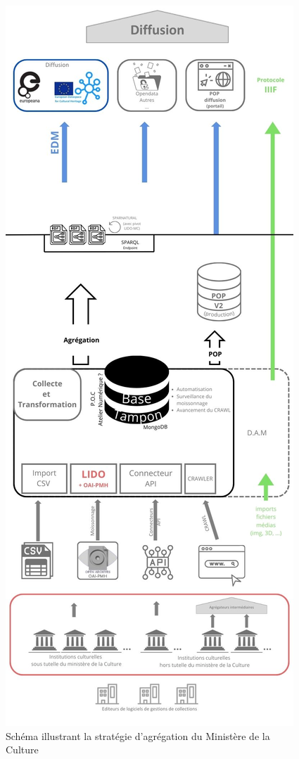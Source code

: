 \begin{figure}[h!]
	\centerline{\includegraphics [height=0.8\textheight]{medias/schema_agregation.jpg} }
	\caption{Schéma illustrant la stratégie d'agrégation du Ministère de la Culture}
\end{figure}